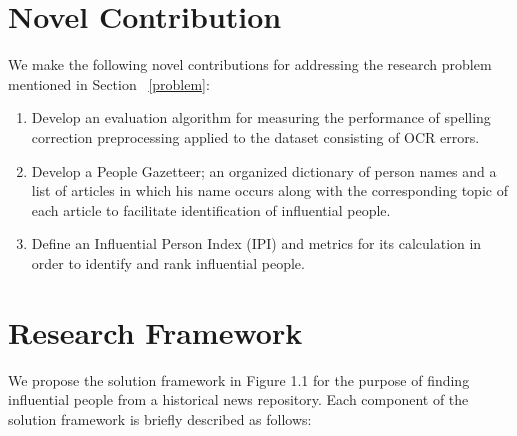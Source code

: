 \section{Novel Contribution}
We make the following novel contributions for addressing the research problem mentioned in Section ~\ref{problem}:
\begin{enumerate}
\item Develop an evaluation algorithm for measuring the performance of spelling correction preprocessing applied to the dataset consisting of OCR errors.
\item Develop a People Gazetteer; an organized  dictionary of person names and a list of articles in which his name occurs along with the corresponding topic of each article to facilitate identification of influential people.
\item Define an Influential Person Index (IPI) and metrics for its calculation in order to identify and rank influential people.
\end{enumerate}


\section {Research Framework }

We propose the solution framework in Figure 1.1 for the purpose of finding influential people from a historical news repository. Each component of the solution framework is briefly described as follows:

